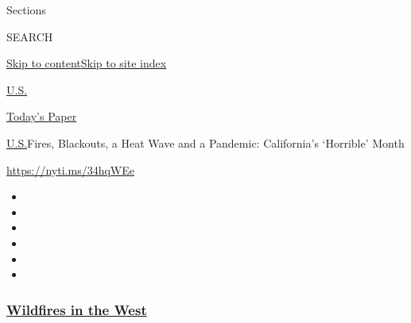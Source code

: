 Sections

SEARCH

\protect\hyperlink{site-content}{Skip to
content}\protect\hyperlink{site-index}{Skip to site index}

\href{https://www.nytimes3xbfgragh.onion/section/us}{U.S.}

\href{https://myaccount.nytimes3xbfgragh.onion/auth/login?response_type=cookie\&client_id=vi}{}

\href{https://www.nytimes3xbfgragh.onion/section/todayspaper}{Today's
Paper}

\href{/section/us}{U.S.}\textbar{}Fires, Blackouts, a Heat Wave and a
Pandemic: California's `Horrible' Month

\url{https://nyti.ms/34hqWEe}

\begin{itemize}
\item
\item
\item
\item
\item
\item
\end{itemize}

\hypertarget{wildfires-in-the-west}{%
\subsubsection{\texorpdfstring{\href{https://www.nytimes3xbfgragh.onion/spotlight/california-wildfires?name=styln-california-wildfires\&region=TOP_BANNER\&block=storyline_menu_recirc\&action=click\&pgtype=Article\&impression_id=8a6d9060-f2b5-11ea-9df0-4b0f68b7e02f\&variant=undefined}{Wildfires
in the West}}{Wildfires in the West}}\label{wildfires-in-the-west}}

